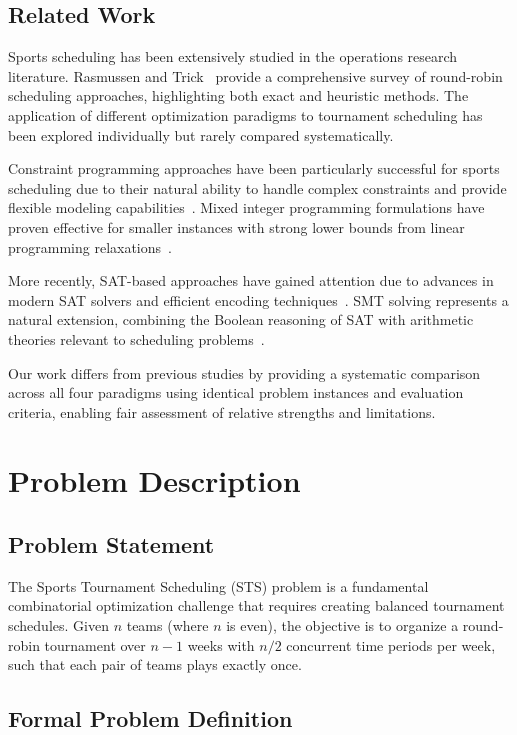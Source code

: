 \documentclass[11pt]{article}
\begin{document}
\subsection{Related Work}

Sports scheduling has been extensively studied in the operations research literature. Rasmussen and Trick~\cite{sports_scheduling} provide a comprehensive survey of round-robin scheduling approaches, highlighting both exact and heuristic methods. The application of different optimization paradigms to tournament scheduling has been explored individually but rarely compared systematically.

Constraint programming approaches have been particularly successful for sports scheduling due to their natural ability to handle complex constraints and provide flexible modeling capabilities~\cite{constraint_programming}. Mixed integer programming formulations have proven effective for smaller instances with strong lower bounds from linear programming relaxations~\cite{mip_book}.

More recently, SAT-based approaches have gained attention due to advances in modern SAT solvers and efficient encoding techniques~\cite{sat_handbook}. SMT solving represents a natural extension, combining the Boolean reasoning of SAT with arithmetic theories relevant to scheduling problems~\cite{smt_survey}.

Our work differs from previous studies by providing a systematic comparison across all four paradigms using identical problem instances and evaluation criteria, enabling fair assessment of relative strengths and limitations.

\section{Problem Description}

\subsection{Problem Statement}

The Sports Tournament Scheduling (STS) problem is a fundamental combinatorial optimization challenge that requires creating balanced tournament schedules. Given $n$ teams (where $n$ is even), the objective is to organize a round-robin tournament over $n-1$ weeks with $n/2$ concurrent time periods per week, such that each pair of teams plays exactly once.

\subsection{Formal Problem Definition}
\end{document}

